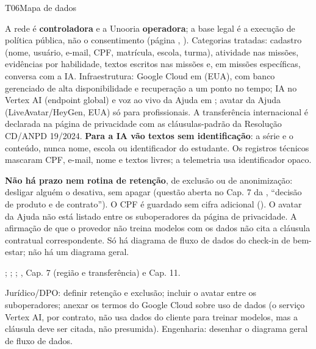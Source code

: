 \begin{resposta}{T06}{Mapa de dados}{\parcial}
\begin{campos}
  \item[Hoje] A rede é \textbf{controladora} e a Unooria \textbf{operadora};
    a base legal é a execução de política pública, não o consentimento
    (página , ). Categorias tratadas:
    cadastro (nome, usuário, e-mail, CPF, matrícula, escola, turma),
    atividade nas missões, evidências por habilidade, textos escritos nas
    missões e, em missões específicas, conversa com a IA. Infraestrutura:
    Google Cloud em \textbf{} (EUA), com banco gerenciado de alta
    disponibilidade e recuperação a um ponto no tempo; IA no Vertex AI
    (endpoint global) e voz ao vivo da Ajuda em ; avatar da
    Ajuda (LiveAvatar/HeyGen, EUA) só para profissionais. A transferência
    internacional é declarada na página de privacidade com as cláusulas-padrão
    da Resolução CD/ANPD 19/2024. \textbf{Para a IA vão textos sem
    identificação}: a série e o conteúdo, nunca nome, escola ou identificador
    do estudante. Os registros técnicos mascaram CPF, e-mail, nome e textos
    livres; a telemetria usa identificador opaco.
  \item[Limitações] \textbf{Não há prazo nem rotina de retenção}, de exclusão
    ou de anonimização: desligar alguém o desativa, sem apagar (questão aberta
    no Cap. 7 da , ``decisão de produto e de contrato''). O CPF é
    guardado sem cifra adicional (). O avatar da Ajuda não está
    listado entre os suboperadores da página de privacidade. A afirmação de
    que o provedor não treina modelos com os dados não cita a cláusula
    contratual correspondente. Só há diagrama de fluxo de dados do
    check-in de bem-estar; não há um diagrama geral.
  \item[Evidência] ;
    ; ;
    , Cap. 7 (região e transferência) e Cap. 11.
  \item[Lacuna] Jurídico/DPO: definir retenção e exclusão; incluir o avatar
    entre os suboperadores; anexar os termos do Google Cloud sobre uso de
    dados (o serviço Vertex AI, por contrato, não usa dados do cliente para
    treinar modelos, mas a cláusula deve ser citada, não presumida).
    Engenharia: desenhar o diagrama geral de fluxo de dados.
\end{campos}
\end{resposta}

